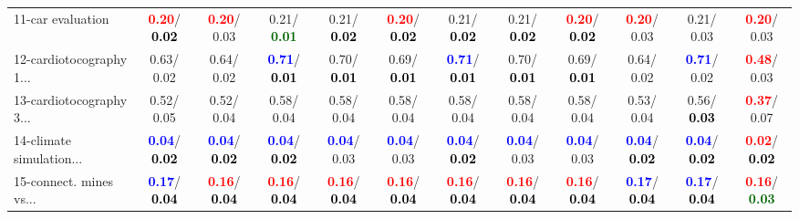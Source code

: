 \begin{table}[h]
\begin{center}
{\begin{tabular}{lc|c|c|c|c|c|c|c|c|c|c}
11-car evaluation & \textcolor{red}{\textbf{  0.20}}/\textcolor{black}{\textbf{  0.02}} & \textcolor{red}{\textbf{  0.20}}/  0.03 &   0.21/\textcolor{darkgreen}{\textbf{  0.01}} &   0.21/\textcolor{black}{\textbf{  0.02}} & \textcolor{red}{\textbf{  0.20}}/\textcolor{black}{\textbf{  0.02}} &   0.21/\textcolor{black}{\textbf{  0.02}} &   0.21/\textcolor{black}{\textbf{  0.02}} & \textcolor{red}{\textbf{  0.20}}/\textcolor{black}{\textbf{  0.02}} & \textcolor{red}{\textbf{  0.20}}/  0.03 &   0.21/  0.03 & \textcolor{red}{\textbf{  0.20}}/  0.03 \\
12-cardiotocography 1... &   0.63/  0.02 &   0.64/  0.02 & \textcolor{blue}{\textbf{  0.71}}/\textcolor{black}{\textbf{  0.01}} &   0.70/\textcolor{black}{\textbf{  0.01}} &   0.69/\textcolor{black}{\textbf{  0.01}} & \textcolor{blue}{\textbf{  0.71}}/\textcolor{black}{\textbf{  0.01}} &   0.70/\textcolor{black}{\textbf{  0.01}} &   0.69/\textcolor{black}{\textbf{  0.01}} &   0.64/  0.02 & \textcolor{blue}{\textbf{  0.71}}/  0.02 & \textcolor{red}{\textbf{  0.48}}/  0.03 \\
13-cardiotocography 3... &   0.52/  0.05 &   0.52/  0.04 &   0.58/  0.04 &   0.58/  0.04 &   0.58/  0.04 &   0.58/  0.04 &   0.58/  0.04 &   0.58/  0.04 &   0.53/  0.04 &   0.56/\textcolor{black}{\textbf{  0.03}} & \textcolor{red}{\textbf{  0.37}}/  0.07 \\
14-climate simulation... & \textcolor{blue}{\textbf{  0.04}}/\textcolor{black}{\textbf{  0.02}} & \textcolor{blue}{\textbf{  0.04}}/\textcolor{black}{\textbf{  0.02}} & \textcolor{blue}{\textbf{  0.04}}/\textcolor{black}{\textbf{  0.02}} & \textcolor{blue}{\textbf{  0.04}}/  0.03 & \textcolor{blue}{\textbf{  0.04}}/  0.03 & \textcolor{blue}{\textbf{  0.04}}/\textcolor{black}{\textbf{  0.02}} & \textcolor{blue}{\textbf{  0.04}}/  0.03 & \textcolor{blue}{\textbf{  0.04}}/  0.03 & \textcolor{blue}{\textbf{  0.04}}/\textcolor{black}{\textbf{  0.02}} & \textcolor{blue}{\textbf{  0.04}}/\textcolor{black}{\textbf{  0.02}} & \textcolor{red}{\textbf{  0.02}}/\textcolor{black}{\textbf{  0.02}} \\ \hline
15-connect. mines vs... & \textcolor{blue}{\textbf{  0.17}}/\textcolor{black}{\textbf{  0.04}} & \textcolor{red}{\textbf{  0.16}}/\textcolor{black}{\textbf{  0.04}} & \textcolor{red}{\textbf{  0.16}}/\textcolor{black}{\textbf{  0.04}} & \textcolor{red}{\textbf{  0.16}}/\textcolor{black}{\textbf{  0.04}} & \textcolor{red}{\textbf{  0.16}}/\textcolor{black}{\textbf{  0.04}} & \textcolor{red}{\textbf{  0.16}}/\textcolor{black}{\textbf{  0.04}} & \textcolor{red}{\textbf{  0.16}}/\textcolor{black}{\textbf{  0.04}} & \textcolor{red}{\textbf{  0.16}}/\textcolor{black}{\textbf{  0.04}} & \textcolor{blue}{\textbf{  0.17}}/\textcolor{black}{\textbf{  0.04}} & \textcolor{blue}{\textbf{  0.17}}/\textcolor{black}{\textbf{  0.04}} & \textcolor{red}{\textbf{  0.16}}/\textcolor{darkgreen}{\textbf{  0.03}} \\

\end{tabular}}
\end{center}
\end{table}
